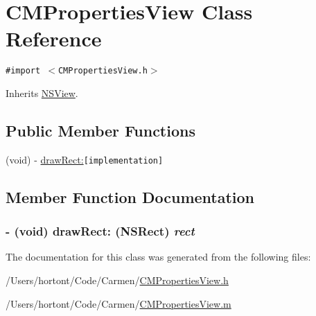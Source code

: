 \hypertarget{interface_c_m_properties_view}{
\section{CMPropertiesView Class Reference}
\label{interface_c_m_properties_view}
}
{\tt \#import $<$CMPropertiesView.h$>$}

Inherits \hyperlink{class_n_s_view}{NSView}.

\subsection*{Public Member Functions}
\begin{CompactItemize}
\item 
(void) - \hyperlink{interface_c_m_properties_view_738dd10127b593c2f26a9bd148cb9657}{drawRect:}{\tt  \mbox{[}implementation\mbox{]}}
\end{CompactItemize}


\subsection{Member Function Documentation}
\hypertarget{interface_c_m_properties_view_738dd10127b593c2f26a9bd148cb9657}{
\subsubsection[drawRect:]{\setlength{\rightskip}{0pt plus 5cm}- (void) drawRect: (NSRect) {\em rect}}}
\label{interface_c_m_properties_view_738dd10127b593c2f26a9bd148cb9657}




The documentation for this class was generated from the following files:\begin{CompactItemize}
\item 
/Users/hortont/Code/Carmen/\hyperlink{_c_m_properties_view_8h}{CMPropertiesView.h}\item 
/Users/hortont/Code/Carmen/\hyperlink{_c_m_properties_view_8m}{CMPropertiesView.m}\end{CompactItemize}
